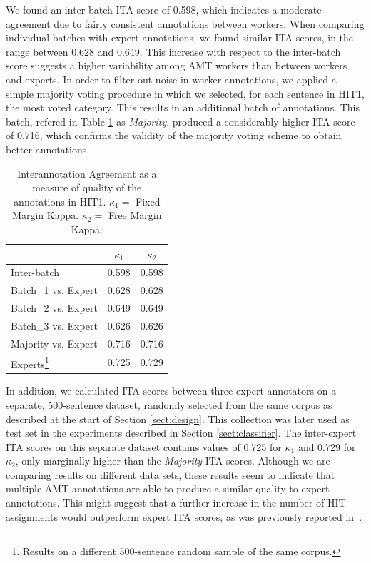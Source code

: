 \documentclass[11pt, a4paper,onecolumn]{article}
\begin{document}
We found an inter-batch ITA score of 0.598, which indicates a moderate agreement due to fairly consistent annotations between workers. When comparing individual batches with expert annotations, we found similar ITA scores, in the range between 0.628 and 0.649. This increase with respect to the inter-batch score suggests a higher variability among AMT workers than between workers and experts. 
In order to filter out noise in worker annotations, we applied a simple majority voting procedure in which we selected, for each sentence in HIT1, the most voted category. This results in an additional batch of annotations. This batch, refered in Table \ref{tablita} as \textit{Majority}, produced a considerably higher ITA score of 0.716, which confirms the validity of the majority voting scheme to obtain better annotations.

\begin{table}[h]
\begin{center}
\begin{tabular}{|l|c|c|}
\hline
& $\kappa_{1}$ & $\kappa_{2}$ \\ 
\hline
Inter-batch & 0.598 & 0.598 \\ \hline
Batch\_1 vs. Expert & 0.628 & 0.628\\
Batch\_2 vs. Expert & 0.649 & 0.649\\
Batch\_3 vs. Expert & 0.626 & 0.626\\ \hline
Majority vs. Expert & 0.716 & 0.716\\ \hline
Experts\footnote{Results on a different 500-sentence random sample of the same corpus.} & 0.725 & 0.729\\ \hline
\end{tabular}
\end{center}
\caption{Interannotation Agreement as a measure of quality of the annotations in HIT1. $\kappa_{1} = $ Fixed Margin Kappa. $\kappa_{2} = $ Free Margin Kappa.}
\label{tablita}
\end{table}


In addition, we calculated ITA scores between three expert annotators on a separate, 500-sentence dataset, randomly selected from the same corpus as described at the start of Section \ref{sect:design}. This collection was later used as test set in the experiments described in Section \ref{sect:classifier}. The inter-expert ITA scores on this separate dataset contains values of 0.725 for $\kappa_{1}$ and 0.729 for $\kappa_{2}$, only marginally higher than the \textit{Majority} ITA scores. Although we are comparing results on different data sets, these results seem to indicate that multiple AMT annotations are able to produce a similar quality to expert annotations. This might suggest that a further increase in the number of HIT assignments would outperform expert ITA scores, as was previously reported in~\cite{snow_cheap_2008}.
\end{document}
